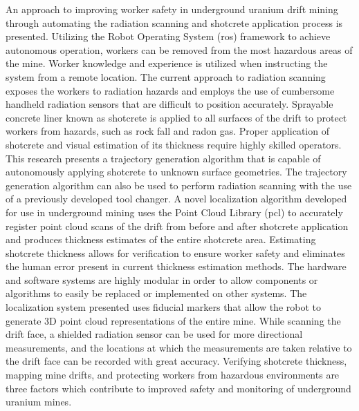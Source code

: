 \abstracter
\begin{spacing}{1.5}
An approach to improving worker safety in underground uranium drift mining through automating the radiation scanning and shotcrete application process is presented. Utilizing the Robot Operating System (\acrshort{ros}) framework to achieve autonomous operation, workers can be removed from the most hazardous areas of the mine. Worker knowledge and experience is utilized when instructing the system from a remote location. The current approach to radiation scanning exposes the workers to radiation hazards and employs the use of cumbersome handheld radiation sensors that are difficult to position accurately. Sprayable concrete liner known as shotcrete is applied to all surfaces of the drift to protect workers from hazards, such as rock fall and radon gas. Proper application of shotcrete and visual estimation of its thickness require highly skilled operators. This research presents a trajectory generation algorithm that is capable of autonomously applying shotcrete to unknown surface geometries. The trajectory generation algorithm can also be used to perform radiation scanning with the use of a previously developed tool changer. A novel localization algorithm developed for use in underground mining uses the Point Cloud Library (\acrshort{pcl}) to accurately register point cloud scans of the drift from before and after shotcrete application and produces thickness estimates of the entire shotcrete area. Estimating shotcrete thickness allows for verification to ensure worker safety and eliminates the human error present in current thickness estimation methods. The hardware and software systems are highly modular in order to allow components or algorithms to easily be replaced or implemented on other systems.  The localization system presented uses fiducial markers that allow the robot to generate 3D point cloud representations of the entire mine. While scanning the drift face, a shielded radiation sensor can be used for more directional measurements, and the locations at which the measurements are taken relative to the drift face can be recorded with great accuracy. Verifying shotcrete thickness, mapping mine drifts, and protecting workers from hazardous environments are three factors which contribute to improved safety and monitoring of underground uranium mines.
\end{spacing}